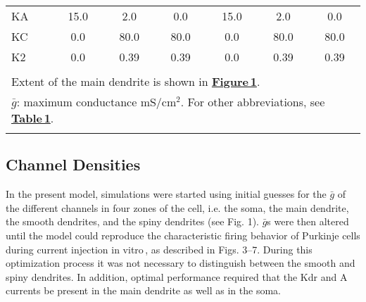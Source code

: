 \documentclass[12pt]{article}
\begin{document}
\begin{table}[!h]
\begin{tabular}{ l c c c c c c }
KA              &15.0             & 2.0                                     & 0.0                              & 15.0             & 2.0                      & 0.0                                                  \\
KC              & 0.0              & 80.0                                   & 80.0                            & 0.0               & 80.0                    & 80.0                                                \\
K2              & 0.0              & 0.39                                    & 0.39                            & 0.0               & 0.39                   & 0.39                                                \\
                   &                     &                                            &                                      &                     &                             &                                                         \\
\multicolumn{7}{l}{Extent of the main dendrite is shown in \href{../pub-purkinje-deschutter1-fig-1/pub-purkinje-deschutter1-fig-1.tex}{\bf Figure\,1}.}                                                                                                                                 \\
\multicolumn{7}{l}{$\bar g$: maximum conductance mS/cm$^2$. For other abbreviations, see \href{../pub-purkinje-deschutter1-table1/pub-purkinje-deschutter1-table1.tex}{\bf Table\,1}.}                                               \\
\multicolumn{7}{l}{}                                                                                                                                                                                                                   \\
\end{tabular}
\end{table}

\subsection*{Channel Densities}

In the present model, simulations were started using initial
guesses for the $\bar g$ of the different channels in four zones of the cell,
i.e. the soma, the main dendrite, the smooth dendrites, and the
spiny dendrites (see Fig. 1). $\bar g$s were then altered until the model
could reproduce the characteristic firing behavior of Purkinje cells
during current injection in vitro\,\cite{R:1980ly, R:1980pi},
as described in Figs. 3--7. During this optimization
process it was not necessary to distinguish between
the smooth and spiny dendrites. In addition, optimal performance
required that the Kdr and A currents be present in the
main dendrite as well as in the soma.
\end{document}
